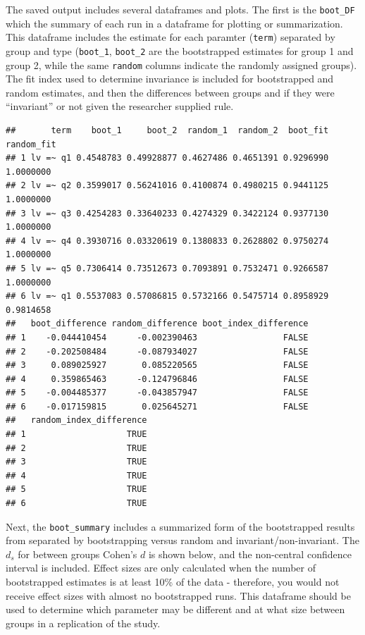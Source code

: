 \documentclass[
  man]{apa7}
\newenvironment{Shaded}{\begin{snugshade}}{\end{snugshade}}
\newcommand{\FunctionTok}[1]{\textcolor[rgb]{0.13,0.29,0.53}{\textbf{#1}}}
\newcommand{\NormalTok}[1]{#1}
\newcommand{\SpecialCharTok}[1]{\textcolor[rgb]{0.81,0.36,0.00}{\textbf{#1}}}
\begin{document}
The saved output includes several dataframes and plots. The first is the \texttt{boot\_DF} which the summary of each run in a dataframe for plotting or summarization. This dataframe includes the estimate for each paramter (\texttt{term}) separated by group and type (\texttt{boot\_1}, \texttt{boot\_2} are the bootstrapped estimates for group 1 and group 2, while the same \texttt{random} columns indicate the randomly assigned groups). The fit index used to determine invariance is included for bootstrapped and random estimates, and then the differences between groups and if they were ``invariant'' or not given the researcher supplied rule.

\small

\begin{Shaded}
\end{Shaded}

\normalsize

\begin{verbatim}
##       term    boot_1     boot_2  random_1  random_2  boot_fit random_fit
## 1 lv =~ q1 0.4548783 0.49928877 0.4627486 0.4651391 0.9296990  1.0000000
## 2 lv =~ q2 0.3599017 0.56241016 0.4100874 0.4980215 0.9441125  1.0000000
## 3 lv =~ q3 0.4254283 0.33640233 0.4274329 0.3422124 0.9377130  1.0000000
## 4 lv =~ q4 0.3930716 0.03320619 0.1380833 0.2628802 0.9750274  1.0000000
## 5 lv =~ q5 0.7306414 0.73512673 0.7093891 0.7532471 0.9266587  1.0000000
## 6 lv =~ q1 0.5537083 0.57086815 0.5732166 0.5475714 0.8958929  0.9814658
##   boot_difference random_difference boot_index_difference
## 1    -0.044410454      -0.002390463                 FALSE
## 2    -0.202508484      -0.087934027                 FALSE
## 3     0.089025927       0.085220565                 FALSE
## 4     0.359865463      -0.124796846                 FALSE
## 5    -0.004485377      -0.043857947                 FALSE
## 6    -0.017159815       0.025645271                 FALSE
##   random_index_difference
## 1                    TRUE
## 2                    TRUE
## 3                    TRUE
## 4                    TRUE
## 5                    TRUE
## 6                    TRUE
\end{verbatim}

Next, the \texttt{boot\_summary} includes a summarized form of the bootstrapped results from separated by bootstrapping versus random and invariant/non-invariant. The \(d_s\) for between groups Cohen's \(d\) is shown below, and the non-central confidence interval is included. Effect sizes are only calculated when the number of bootstrapped estimates is at least 10\% of the data - therefore, you would not receive effect sizes with almost no bootstrapped runs. This dataframe should be used to determine which parameter may be different and at what size between groups in a replication of the study.
\end{document}
